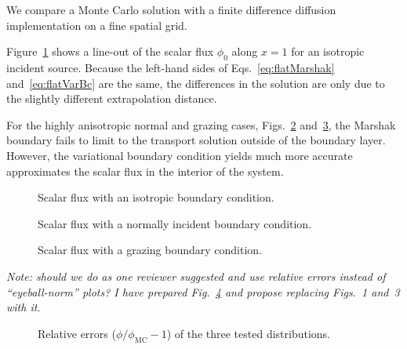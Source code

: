 \documentclass{anstrans}
\begin{document}
We compare a Monte Carlo solution with a finite difference diffusion
implementation on a fine spatial grid.

Figure~\ref{fig:isotropic} shows a line-out of the scalar flux $\phi_0$ along
$x=1$ for an isotropic incident source. Because the left-hand sides of
Eqs.~\eqref{eq:flatMarshak} and~\eqref{eq:flatVarBc} are the same, the
differences in the solution are only due to the slightly different
extrapolation distance.

For the highly anisotropic normal and grazing cases,
Figs.~\ref{fig:delta} and~\ref{fig:grazing}, the Marshak boundary fails to
limit to the transport solution outside of the boundary layer. However, 
the variational boundary condition yields much more accurate
approximates the scalar flux in the interior of the system.

\begin{figure}[htb!]
  \centering
  \hspace{-.5in}
  
  \hspace{-.5in}
  \caption{Scalar flux with an isotropic boundary condition.}
  \label{fig:isotropic}
\end{figure}

\begin{figure}[htb!]
  \centering
  \hspace{-.5in}
  
  \hspace{-.5in}
  \caption{Scalar flux with a normally incident boundary condition.}
  \label{fig:delta}
\end{figure}

\begin{figure}[htb!]
  \centering
  \hspace{-.5in}
  
  \hspace{-.5in}
  \caption{Scalar flux with a grazing boundary condition.}
  \label{fig:grazing}
\end{figure}

\emph{Note: should we do as one reviewer suggested and use relative errors
instead of ``eyeball-norm'' plots? I have prepared Fig.~\ref{fig:relative} and
propose replacing Figs.~1 and~3 with it.}
\begin{figure}[h!]
  \centering
  \hspace{-.5in}
  
  \hspace{-.5in}
  \caption{Relative errors ($\phi/\phi_\text{MC} - 1$) of the three tested
  distributions.}
  \label{fig:relative}
\end{figure}
\end{document}
